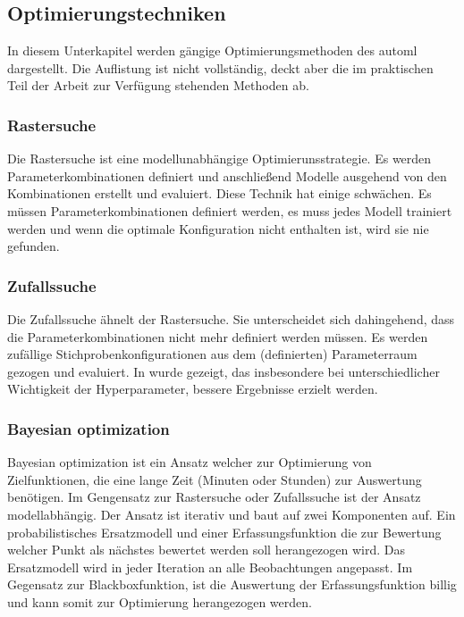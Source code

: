 	\subsection{Optimierungstechniken}
	\label{subsec:Optimierungstechniken}
	In diesem Unterkapitel werden gängige Optimierungsmethoden des \ac{automl} dargestellt. Die Auflistung ist nicht vollständig, deckt aber die im praktischen Teil der Arbeit zur Verfügung stehenden Methoden ab.  
	
	\subsubsection{Rastersuche}
	Die Rastersuche ist eine modellunabhängige Optimierunsstrategie. Es werden Parameterkombinationen definiert und anschließend Modelle ausgehend von den Kombinationen erstellt und evaluiert. Diese Technik hat einige schwächen. Es müssen Parameterkombinationen definiert werden, es muss jedes Modell trainiert werden und wenn die optimale Konfiguration nicht enthalten ist, wird sie nie gefunden. \cite{Michelucci.2018}
	
	\subsubsection{Zufallssuche}
	Die Zufallssuche ähnelt der Rastersuche. Sie unterscheidet sich dahingehend, dass die Parameterkombinationen nicht mehr definiert werden müssen. Es werden zufällige Stichprobenkonfigurationen aus dem (definierten) Parameterraum gezogen und evaluiert. 
	In \cite{BergstraJamesandYoshuaBengio..2012} wurde gezeigt, das insbesondere bei unterschiedlicher Wichtigkeit der Hyperparameter, bessere Ergebnisse erzielt werden. 

	\subsubsection{Bayesian optimization}
	Bayesian optimization ist ein Ansatz welcher zur Optimierung von Zielfunktionen, die eine lange Zeit (Minuten oder Stunden) zur Auswertung benötigen. Im Gengensatz zur Rastersuche oder Zufallssuche ist der Ansatz modellabhängig. Der Ansatz ist iterativ und baut auf zwei Komponenten auf. Ein probabilistisches Ersatzmodell und einer Erfassungsfunktion die zur Bewertung welcher Punkt als nächstes bewertet werden soll herangezogen wird. Das Ersatzmodell wird in jeder Iteration an alle Beobachtungen angepasst. Im Gegensatz zur Blackboxfunktion, ist die Auswertung der Erfassungsfunktion billig und kann somit zur Optimierung herangezogen werden.
	\cite{Frazier.08.07.2018}
			
